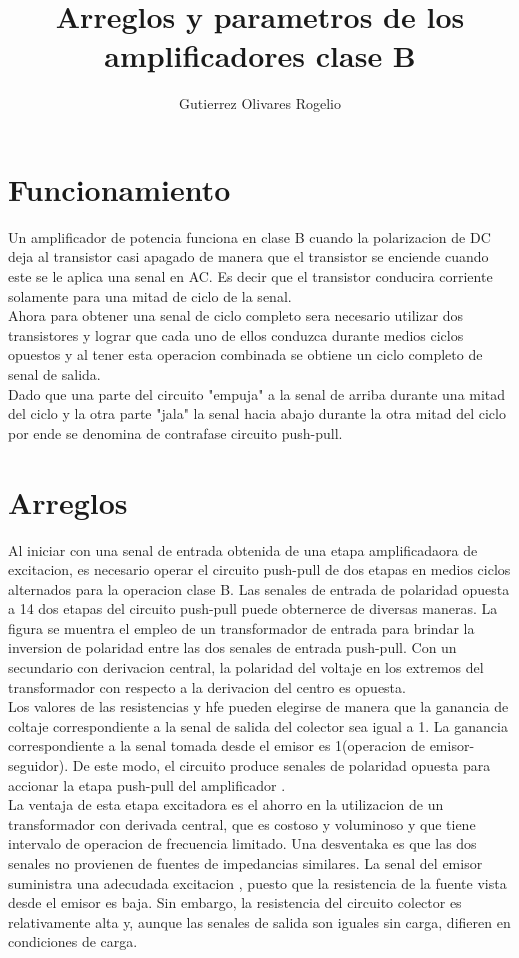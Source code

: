 \documentclass[12pt,a4paper]{article}
\author{Gutierrez Olivares Rogelio}
\title{Arreglos y parametros de los amplificadores clase B}
\begin{document}
\maketitle
\section{Funcionamiento}

Un amplificador de potencia funciona en clase B cuando la polarizacion de DC deja al transistor casi apagado de manera que el transistor se enciende cuando este se le aplica una senal en AC. Es decir que el transistor conducira corriente solamente para una mitad de ciclo de la senal.\\
Ahora para obtener una senal de ciclo completo sera necesario utilizar dos transistores y lograr que cada uno de ellos conduzca durante medios ciclos opuestos y al tener esta operacion combinada se obtiene un ciclo completo de senal de salida.\\
Dado que una parte del circuito "empuja" a la senal de arriba durante una mitad del ciclo y la otra parte "jala" la senal hacia abajo durante la otra mitad del ciclo por ende se denomina de contrafase circuito push-pull.
\section{Arreglos}
Al iniciar con una senal de entrada obtenida de una etapa amplificadaora de excitacion, es necesario operar el circuito push-pull de dos etapas en medios ciclos alternados para la operacion clase B. Las senales de entrada de polaridad opuesta a 14 dos etapas del circuito push-pull puede obternerce de diversas maneras. La figura se muentra el empleo de un transformador de entrada para brindar la inversion de polaridad entre las dos senales de entrada push-pull. Con un secundario con derivacion central, la polaridad del voltaje en los extremos del transformador con respecto a la derivacion del centro es opuesta.\\
Los valores de las resistencias y hfe pueden elegirse de manera que la ganancia de coltaje correspondiente a la senal de salida del colector sea igual a 1. La ganancia correspondiente a la senal tomada desde el emisor es 1(operacion de emisor-seguidor). De este modo, el circuito produce senales de polaridad opuesta para accionar la etapa push-pull del amplificador .\\
La ventaja de esta etapa excitadora es el ahorro en la utilizacion de un transformador con derivada central, que es costoso y voluminoso y que tiene intervalo de operacion de frecuencia limitado. Una desventaka es que las dos senales no provienen de fuentes de impedancias similares. La senal del emisor suministra una adecudada excitacion , puesto que la resistencia de la fuente vista desde el emisor es baja. Sin embargo, la resistencia del circuito colector es relativamente alta y, aunque las senales de salida son iguales sin carga, difieren en condiciones de carga.\\\\
\end{document}
